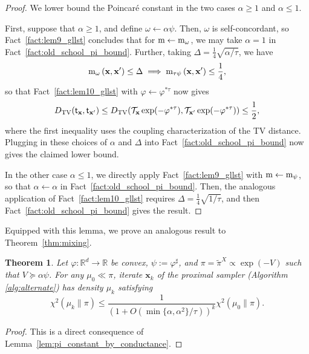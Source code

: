 \documentclass[11pt]{article}
\newtheorem{theorem}{Theorem}
\newcommand{\defeq}{:=}
\newcommand{\R}{\mathbb{R}}
\newcommand{\Par}[1]{\left(#1\right)}
\newcommand{\0}{\mathbf{0}}
\newcommand{\1}{\mathbf{1}}
\newcommand{\vx}{\mathbf{x}}
\newcommand{\tilt}{\mathcal{T}}
\newcommand{\vhi}{\varphi}
\newcommand{\dtv}{D_{\textup{TV}}}
\newcommand{\tpi}{\tilde{\pi}}
\begin{document}
\begin{proof}
We lower bound the Poincar\'e constant in the two cases $\alpha \ge 1$ and $\alpha \le 1$.

First, suppose that $\alpha \ge 1$, and define $\omega \gets \alpha \psi$. Then, $\omega$ is self-concordant, so Fact~\ref{fact:lem9_gllst} concludes that for $\textup{m} \gets \textup{m}_{\omega}$, we may take $\alpha = 1$ in Fact~\ref{fact:old_school_pi_bound}. Further, taking $\Delta = \frac 1 4 \sqrt{\alpha/\tau}$, we have
\[\textup{m}_{\omega}\Par{\vx, \vx'} \le \Delta \implies \textup{m}_{\tau \psi}\Par{\vx, \vx'} \le \frac 1 4,\]
so that Fact~\ref{fact:lem10_gllst} with $\vhi \gets \vhi^{\ast \tau}$ now gives
\[
\dtv(\mathsf{t}_\vx, \mathsf{t}_{\vx'})\leq \dtv(\tilt_\vx\exp(-\vhi^{*\tau}),\tilt_{\vx'}\exp(-\vhi^{*\tau}))\le\frac{1}{2},
\]
where the first inequality uses the coupling characterization of the TV distance. Plugging in these choices of $\alpha$ and $\Delta$ into Fact~\ref{fact:old_school_pi_bound} now gives the claimed lower bound.

In the other case $\alpha \le 1$, we directly apply Fact~\ref{fact:lem9_gllst} with $\textup{m} \gets \textup{m}_\psi$, so that $\alpha \gets \alpha$ in Fact~\ref{fact:old_school_pi_bound}. Then, the analogous application of Fact~\ref{fact:lem10_gllst} requires $\Delta = \frac 1 4 \sqrt{1/\tau}$, and then Fact~\ref{fact:old_school_pi_bound} gives the result.

\end{proof}

Equipped with this lemma, we prove an analogous result to Theorem~\ref{thm:mixing}.
\begin{theorem}\label{thm:mixing_alt}
Let $\vhi: \R^d \to \R$ be convex, $\psi \defeq \vhi^\sharp$, and $\pi=\tpi^X \propto \exp(-V)$ such that $V \succeq \alpha\psi$.  For any $\mu_0\ll \pi$, iterate $\vx_k$ of the proximal sampler (Algorithm \ref{alg:alternate}) has density $\mu_k$ satisfying
    \[
        \chi^2(\mu_k \|\pi) \le \frac{1}{(1 + O(\min\{\alpha, \alpha^2\}/\tau))^{k}}\chi^2(\mu_0\|\pi).
    \]
\end{theorem}
\begin{proof}
    This is a direct consequence of Lemma~\ref{lem:pi_constant_by_conductance}.
\end{proof}
\end{document}
